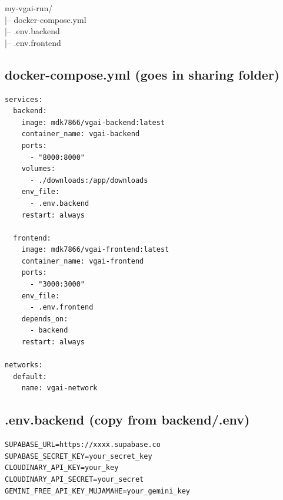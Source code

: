 \documentclass[12pt]{article}
\newenvironment{codeblock}{%
  \needspace{6\baselineskip}%
  \noindent\minipage{\linewidth}%
}{%
  \endminipage%
}
\begin{document}
\begin{center}
\noindent\begin{minipage}{0.55\linewidth}
\begin{mdframed}[linecolor=sectioncolor,linewidth=1.5pt,backgroundcolor=stepbg,
  innerleftmargin=14pt,innerrightmargin=14pt,innertopmargin=8pt,innerbottommargin=8pt]
\ttfamily
my-vgai-run/\\
\hspace*{1em}|-- docker-compose.yml\\
\hspace*{1em}|-- .env.backend\\
\hspace*{1em}|-- .env.frontend
\end{mdframed}
\end{minipage}
\end{center}

\subsection{docker-compose.yml (goes in sharing folder)}
\begin{codeblock}
\begin{lstlisting}[style=codestyle]
services:
  backend:
    image: mdk7866/vgai-backend:latest
    container_name: vgai-backend
    ports:
      - "8000:8000"
    volumes:
      - ./downloads:/app/downloads
    env_file:
      - .env.backend
    restart: always

  frontend:
    image: mdk7866/vgai-frontend:latest
    container_name: vgai-frontend
    ports:
      - "3000:3000"
    env_file:
      - .env.frontend
    depends_on:
      - backend
    restart: always

networks:
  default:
    name: vgai-network
\end{lstlisting}
\end{codeblock}

\subsection{.env.backend (copy from backend/.env)}
\begin{codeblock}
\begin{lstlisting}[style=codestyle]
SUPABASE_URL=https://xxxx.supabase.co
SUPABASE_SECRET_KEY=your_secret_key
CLOUDINARY_API_KEY=your_key
CLOUDINARY_API_SECRET=your_secret
GEMINI_FREE_API_KEY_MUJAMAHE=your_gemini_key
\end{lstlisting}
\end{codeblock}
\end{document}
